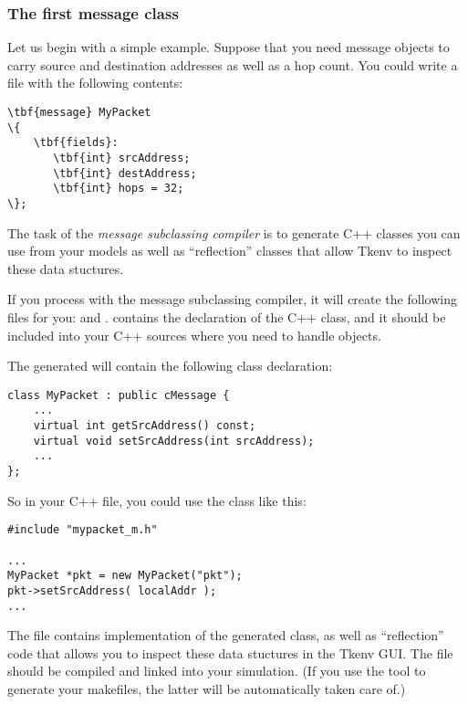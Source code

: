 \subsubsection{The first message class}

Let us begin with a simple example. Suppose that you need message objects to
carry source and destination addresses as well as a hop count. You could write
a  file with the following contents:

\begin{Verbatim}[commandchars=\\\{\}]
\tbf{message} MyPacket
\{
    \tbf{fields}:
       \tbf{int} srcAddress;
       \tbf{int} destAddress;
       \tbf{int} hops = 32;
\};
\end{Verbatim}

The task of the \textit{message subclassing compiler} is to generate C++ classes
you can use from your models as well as ``reflection'' classes that allow
Tkenv to inspect these data stuctures.

If you process  with the message subclassing compiler, it will
create the following files for you:  and .
 contains the declaration of the  C++ class, and
it should be included into your C++ sources where you need to handle
 objects.

The generated  will contain the following class declaration:

\begin{verbatim}
class MyPacket : public cMessage {
    ...
    virtual int getSrcAddress() const;
    virtual void setSrcAddress(int srcAddress);
    ...
};
\end{verbatim}

So in your C++ file, you could use the  class like this:

\begin{verbatim}
#include "mypacket_m.h"

...
MyPacket *pkt = new MyPacket("pkt");
pkt->setSrcAddress( localAddr );
...
\end{verbatim}

The  file contains implementation of the generated 
class, as well as ``reflection'' code that allows you to inspect these data
stuctures in the Tkenv GUI. The  file should be compiled and
linked into your simulation. (If you use the  tool
to generate your makefiles, the latter will be automatically taken care of.)


